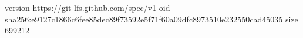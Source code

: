 version https://git-lfs.github.com/spec/v1
oid sha256:e9127c1866c6fee85dec89f73592e5f71f60a09dfc8973510e232550cad45035
size 699212
